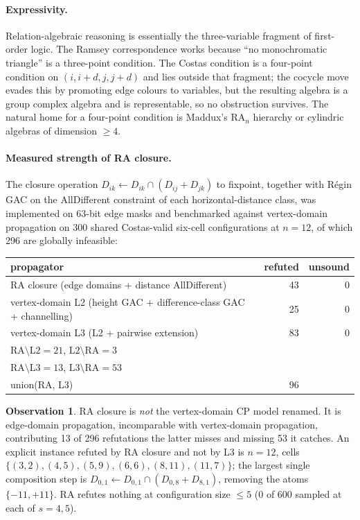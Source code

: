 \documentclass[11pt,a4paper]{article}
\theoremstyle{definition}
\newtheorem{observation}[theorem]{Observation}
\newcommand{\RA}{\mathrm{RA}}
\begin{document}
\paragraph{Expressivity.} Relation-algebraic reasoning is essentially the
three-variable fragment of first-order logic. The Ramsey correspondence works
because ``no monochromatic triangle'' is a three-point condition. The Costas
condition is a four-point condition on $(i,i{+}d,j,j{+}d)$ and lies outside that
fragment; the cocycle move evades this by promoting edge colours to variables,
but the resulting algebra is a group complex algebra and is representable, so no
obstruction survives. The natural home for a four-point condition is Maddux's
$\RA_n$ hierarchy or cylindric algebras of dimension $\ge4$.

\paragraph{Measured strength of RA closure.} The closure operation
$D_{ik}\leftarrow D_{ik}\cap(D_{ij}+D_{jk})$ to fixpoint, together with Régin
GAC on the AllDifferent constraint of each horizontal-distance class, was
implemented on 63-bit edge masks and benchmarked against vertex-domain
propagation on 300 shared Costas-valid six-cell configurations at $n=12$, of
which 296 are globally infeasible:

\begin{center}
\begin{tabular}{@{}lrr@{}}
\toprule
propagator & refuted & unsound \\
\midrule
RA closure (edge domains + distance AllDifferent) & 43 & 0 \\
vertex-domain L2 (height GAC + difference-class GAC + channelling) & 25 & 0 \\
vertex-domain L3 (L2 + pairwise extension) & 83 & 0 \\
\midrule
$\text{RA}\setminus\text{L2}=21$, $\text{L2}\setminus\text{RA}=3$ & &\\
$\text{RA}\setminus\text{L3}=13$, $\text{L3}\setminus\text{RA}=53$ & &\\
union(RA, L3) & 96 & \\
\bottomrule
\end{tabular}
\end{center}

\begin{observation}
RA closure is \emph{not} the vertex-domain CP model renamed. It is edge-domain
propagation, incomparable with vertex-domain propagation, contributing 13 of 296
refutations the latter misses and missing 53 it catches. An explicit instance
refuted by RA closure and not by L3 is $n=12$, cells
$\{(3,2),(4,5),(5,9),(6,6),(8,11),(11,7)\}$; the largest single composition step
is $D_{0,1}\leftarrow D_{0,1}\cap(D_{0,8}+D_{8,1})$, removing the atoms
$\{-11,+11\}$. RA refutes nothing at configuration size $\le5$ (0 of 600 sampled
at each of $s=4,5$).
\end{observation}
\end{document}
